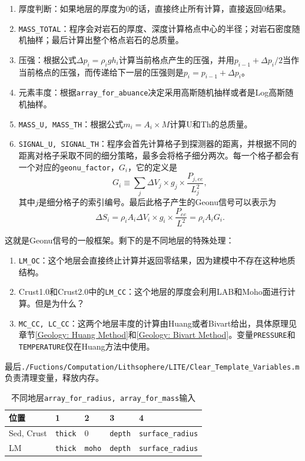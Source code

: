 				\begin{enumerate}
					\item 厚度判断：如果地层的厚度为$0$的话，直接终止所有计算，直接返回$0$结果。
					\item \texttt{MASS\_TOTAL}：程序会对岩石的厚度、深度计算格点中心的半径；对岩石密度随机抽样；最后计算出整个格点岩石的总质量。
					\item 压强：根据公式$\Delta p_i = \rho_i g h_i$计算当前格点产生的压强，并用$p_{i - 1} + \Delta p_i/2$当作当前格点的压强，而传递给下一层的压强则是$p_i = p_{i -1 } + \Delta p_i$。
					\item 元素丰度：根据\texttt{array\_for\_abuance}决定采用高斯随机抽样或者是Log高斯随机抽样。
					\item \texttt{MASS\_U, MASS\_TH}：根据公式$m_i = A_i \times M$计算U和Th的总质量。
					\item \texttt{SIGNAL\_U, SIGNAL\_TH}：程序会首先计算格子到探测器的距离，并根据不同的距离对格子采取不同的细分策略，最多会将格子细分两次。每一个格子都会有一个对应的\texttt{geonu\_factor}，$G_i$，它的定义是
						\begin{equation}
							G_i
							\equiv \sum_j \Delta V_j \times g_j \times \frac{P_{j, ee}}{L_j^2},
						\end{equation}
					其中$j$是细分格子的索引编号。最后此格子产生的Geonu信号可以表示为
						\begin{equation}
							\Delta S_i
							= \rho_i A_i \Delta V_i \times g_i \times \frac{P_{ee}}{L^2}
							= \rho_i A_i G_i.
						\end{equation}
				\end{enumerate}
			这就是Geonu信号的一般框架。剩下的是不同地层的特殊处理：
				\begin{enumerate}
					\item \texttt{LM\_OC}：这个地层会直接终止计算并返回零结果，因为建模中不存在这种地质结构。
					\item Crust1.0和Crust2.0中的\texttt{LM\_CC}：这个地层的厚度会利用LAB和Moho面进行计算。但是为什么？
					\item \texttt{MC\_CC, LC\_CC}：这两个地层丰度的计算由Huang或者Bivart给出，具体原理见章节\ref{Geology: Huang Method}和\ref{Geology: Bivart Method}。变量\texttt{PRESSURE}和\texttt{TEMPERATURE}仅在Huang方法中使用。
				\end{enumerate}
			最后\texttt{./Fuctions/Computation/Lithsophere/LITE/Clear\_Template\_Variables.m}负责清理变量，释放内存。
				\begin{table}[H]
					\centering
					\caption{不同地层\texttt{array\_for\_radius, array\_for\_mass}输入}
					\begin{tabular}{p{3cm}|p{2cm}p{2cm}p{2cm}p{3cm}}
						\hline
						\hline
						位置 & 1 & 2 & 3 & 4\\
						\hline
						Sed, Crust & \texttt{thick} & $0$ & \texttt{depth} & \texttt{surface\_radius}\\
						\hline
						LM & \texttt{thick} & \texttt{moho} & \texttt{depth} & \texttt{surface\_radius}\\
						\hline
						\hline
						\hline
					\end{tabular}
				\end{table}
